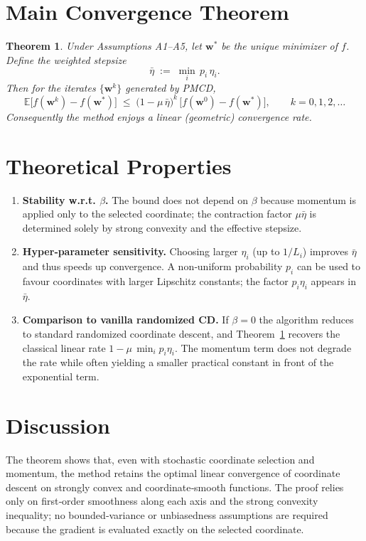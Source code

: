 \documentclass[11pt]{article}
\newtheorem{theorem}{Theorem}[section]
\begin{document}
\section{Main Convergence Theorem}
\begin{theorem}\label{thm:linear}
Under Assumptions A1–A5, let $\mathbf w^{*}$ be the unique minimizer of $f$.
Define the weighted stepsize
\[
\bar\eta \;:=\; \min_{i}\,p_i\,\eta_i .
\]
Then for the iterates $\{\mathbf w^{k}\}$ generated by PMCD,
\[
\boxed{
\mathbb E\!\bigl[f(\mathbf w^{k})-f(\mathbf w^{*})\bigr]
\;\le\;
\bigl(1-\mu\,\bar\eta\bigr)^{k}\,
\bigl[f(\mathbf w^{0})-f(\mathbf w^{*})\bigr] } ,
\qquad k=0,1,2,\dots
\]
Consequently the method enjoys a \emph{linear} (geometric) convergence rate.
\end{theorem}

\section{Theoretical Properties}
\begin{enumerate}[label={\bf P\arabic*:}, leftmargin=*, itemsep=2pt]
\item \textbf{Stability w.r.t. $\beta$.}
The bound does not depend on $\beta$ because momentum is applied only
to the selected coordinate; the contraction factor $\mu\bar\eta$ is
determined solely by strong convexity and the effective stepsize.
\item \textbf{Hyper‑parameter sensitivity.}
Choosing larger $\eta_i$ (up to $1/L_i$) improves $\bar\eta$ and thus speeds up convergence.
A non‑uniform probability $p_i$ can be used to favour coordinates with larger
Lipschitz constants; the factor $p_i\eta_i$ appears in $\bar\eta$.
\item \textbf{Comparison to vanilla randomized CD.}
If $\beta=0$ the algorithm reduces to standard randomized coordinate descent,
and Theorem~\ref{thm:linear} recovers the classical linear rate
$1-\mu\,\min_i p_i\eta_i$.
The momentum term does not degrade the rate while often yielding a smaller
practical constant in front of the exponential term.
\end{enumerate}

\section{Discussion}
The theorem shows that, even with stochastic coordinate selection and
momentum, the method retains the optimal linear convergence of coordinate
descent on strongly convex and coordinate‑smooth functions. The proof
relies only on first‑order smoothness along each axis and the strong
convexity inequality; no bounded‑variance or unbiasedness assumptions are
required because the gradient is evaluated exactly on the selected
coordinate.
\end{document}
